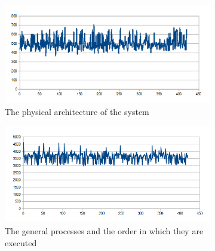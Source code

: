 \begin{figure}[htbp]
	\centering
	\begin{subfigure}[t]{1\textwidth}
		\centering
    		\includegraphics[scale=0.75]{content/images/Experiment/NightRounds}
   	 	\caption{The physical architecture of the system}
    	\label{fig:architecture}
    \end{subfigure}
 
    \begin{subfigure}[t]{1\textwidth}
		\centering         
        \includegraphics[scale=0.75]{content/images/Experiment/NightCollection}
        \caption{The general processes and the order in which they are executed}
        \label{fig:processes}
    \end{subfigure}
    \caption{}
\end{figure}

